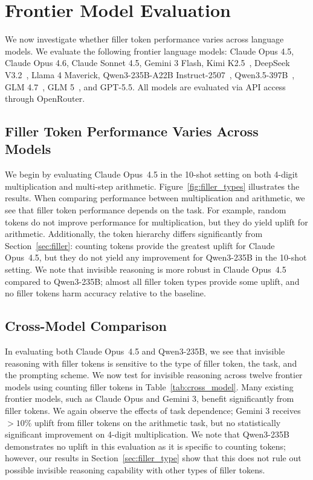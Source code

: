 \documentclass{article}
\begin{document}
\section{Frontier Model Evaluation}
\label{sec:frontier}

We now investigate whether filler token performance varies across language models. We evaluate the following frontier language models: Claude Opus 4.5, Claude Opus 4.6, Claude Sonnet 4.5, Gemini 3 Flash, Kimi K2.5~\citep{kimiteam2026kimik25visualagentic}, DeepSeek V3.2~\citep{deepseekai2025deepseekv32pushingfrontieropen}, Llama 4 Maverick, Qwen3-235B-A22B Instruct-2507~\citep{yang2025qwen3technicalreport}, Qwen3.5-397B~\citep{qwen35blog}, GLM 4.7~\citep{glm2024chatglmfamilylargelanguage}, GLM 5~\citep{glm5}, and GPT-5.5. All models are evaluated via API access through OpenRouter.

\subsection{Filler Token Performance Varies Across Models}
We begin by evaluating Claude Opus~4.5 in the 10-shot setting on both 4-digit multiplication and multi-step arithmetic. Figure~\ref{fig:filler_types} illustrates the results. When comparing performance between multiplication and arithmetic, we see that filler token performance depends on the task. For example, random tokens do not improve performance for multiplication, but they do yield uplift for arithmetic. Additionally, the token hierarchy differs significantly from Section~\ref{sec:filler}: counting tokens provide the greatest uplift for Claude Opus~4.5, but they do not yield any improvement for  Qwen3-235B in the 10-shot setting. We note that invisible reasoning is more robust in Claude Opus~4.5 compared to Qwen3-235B; almost all filler token types provide some uplift, and no filler tokens harm accuracy relative to the baseline.

\subsection{Cross-Model Comparison}
In evaluating both Claude Opus~4.5 and Qwen3-235B, we see that invisible reasoning with filler tokens is sensitive to the type of filler token, the task, and the prompting scheme. We now test for invisible reasoning across twelve frontier models using counting filler tokens in Table~\ref{tab:cross_model}. Many existing frontier models, such as Claude Opus and Gemini 3, benefit significantly from filler tokens. We again observe the effects of task dependence; Gemini 3 receives $>10\%$ uplift from filler tokens on the arithmetic task, but no statistically significant improvement on 4-digit multiplication. We note that Qwen3-235B demonstrates no uplift in this evaluation as it is specific to counting tokens; however, our results in Section~\ref{sec:filler_type} show that this does not rule out possible invisible reasoning capability with other types of filler tokens.
\end{document}
